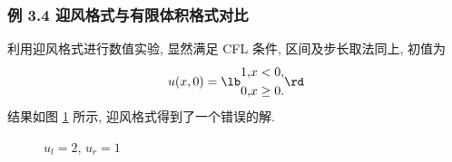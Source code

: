 \documentclass[UTF8, a4paper, 12pt, oneside, onecolumn]{article}
\begin{document}
\subsubsection{例 3.4 迎风格式与有限体积格式对比}

利用迎风格式进行数值实验, 显然满足 CFL 条件, 区间及步长取法同上, 初值为
$$u(x, 0) = \lb \begin{aligned}
	1,	&	x < 0,\\
	0,	&	x \geq 0.
\end{aligned} \rd$$
结果如图 \ref{fig:burgers6} 所示, 迎风格式得到了一个错误的解.

\begin{figure}[H]\centering{}
	\resizebox{0.6\linewidth}{!}{}
	\caption{$u_l = 2$, $u_r = 1$}\label{fig:burgers6}
\end{figure}
\end{document}
